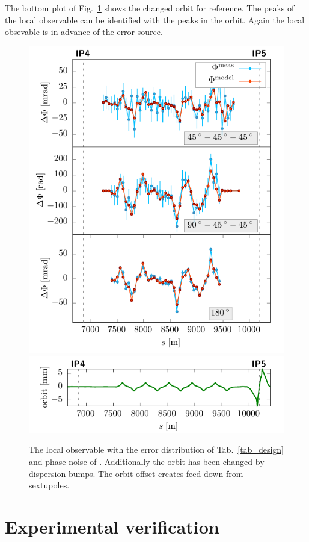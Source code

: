 The bottom plot of Fig.~\ref{fig_disp_noise} shows the changed orbit for reference.
The peaks of the local observable can be identified with the peaks in the orbit.
Again the local obsevable is in 
advance of the error source.
%
\begin{figure}[t]
  \centering
  \includegraphics[width=.7\linewidth]{sim_disp}\\
  \includegraphics[width=.7\linewidth]{sim_orbit_x_noise_disp}
  \caption{The local observable with the error distribution of Tab.~\ref{tab_design} and phase noise
    of \noiserms. Additionally the orbit has been changed by dispersion bumps. The orbit offset creates
  feed-down from sextupoles.}
  \label{fig_disp_noise}
\end{figure}
%
\section{Experimental verification}
\label{sec:measurements}

